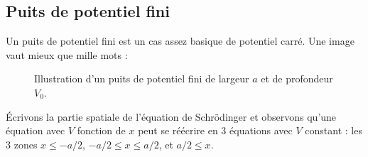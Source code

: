 \documentclass[12pt, a4paper]{book}
\begin{document}
\subsection{Puits de potentiel fini}
Un puits de potentiel fini est un cas assez basique de potentiel carré. Une image vaut mieux que mille mots :

\begin{figure}[h]
  \centering
  \scalebox{1.2}{}
  \caption{Illustration d'un puits de potentiel fini de largeur $a$ et de profondeur $V_0$.}
  \label{fig:chap2-potentiel_fini}
\end{figure}

Écrivons la partie spatiale de l'équation de Schrödinger et observons qu'une équation avec $V$ fonction de $x$ peut se réécrire en 3 équations avec $V$ constant : les 3 zones $x\leq -a/2$, $-a/2\leq x\leq a/2$, et $a/2 \leq x$.
\end{document}
